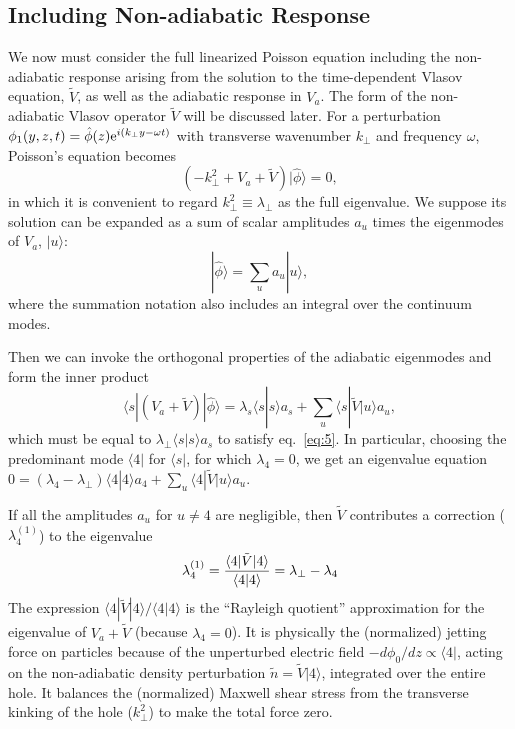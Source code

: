 \documentclass[12pt]{article}
\def\ket#1{|#1\rangle}
\def\bra#1{\langle#1}
\begin{document}
\subsection{Including Non-adiabatic Response}
We now must consider the full linearized Poisson equation including the
non-adiabatic response arising from the solution to the time-dependent
Vlasov equation, $\tilde{V}$, as well as the adiabatic response
in $V_a$. The form of the non-adiabatic Vlasov operator $\tilde{V}$ will
be discussed later. For a perturbation
$\phi_1(y,z,t)=\hat\phi(z){\rm e}^{i(k_\perp y-\omega t)}$ with
transverse wavenumber $k_\perp$ and frequency $\omega$, Poisson's
equation becomes
\begin{equation}
  \label{eq:5}
  (-k_\perp^2+V_a+\tilde{V})\ket{\hat\phi}=0,
\end{equation}
in which it is convenient to regard $k_\perp^2\equiv\lambda_\perp$ as the
full eigenvalue. 
We suppose its solution can be expanded as a sum of scalar
amplitudes $a_u$ times the eigenmodes of $V_a$, $\ket{u}$:
\begin{equation}
  \label{eq:6}
  \ket{\hat\phi}=\sum_u a_u \ket{u},
\end{equation}
where the summation notation also includes an integral over the
continuum modes.

Then we can invoke the orthogonal properties of the
adiabatic eigenmodes and form the inner product
\begin{equation}
  \label{eq:7}
  \bra{s}|(%
  V_a+\tilde{V})\ket{\hat\phi}
  = %
  \lambda_s\bra{s}\ket{s}a_s+\sum_u\bra{s}|\tilde{V}\ket{u}a_u,
\end{equation}
which must be equal to $\lambda_\perp\bra{s}\ket{s}a_s$ to satisfy eq.\ \ref{eq:5}.
In particular, choosing the predominant mode $\bra{4}|$ for
$\bra{s}|$, for which $\lambda_4=0$, we get an eigenvalue equation
$0=(\lambda_4-\lambda_\perp)\bra{4}\ket{4}a_4+\sum_u\bra{4}|\tilde{V}\ket{u}a_u$.

If all the amplitudes $a_u$ for $u\not=4$ are negligible, then
$\tilde{V}$ contributes a correction ($\lambda_{4}^{(1)}$) to the eigenvalue
\begin{equation}
  \label{eq:8}
  \lambda_{4}^{(1)}= {\bra{4}|\tilde{V}\ket{4}\over\bra{4}\ket{4}}=\lambda_\perp-\lambda_4
\end{equation}
The expression $\bra{4}|\tilde{V}\ket{4}/\bra{4}\ket{4}$ is the ``Rayleigh
quotient'' approximation for the eigenvalue of $V_a+\tilde{V}$
(because $\lambda_4=0$). It is
physically the (normalized) jetting force on particles because of the
unperturbed electric field $-d\phi_0/dz\propto\bra{4}|$, acting on the
non-adiabatic density perturbation $\tilde n = \tilde{V}\ket{4}$, integrated
over the entire hole. It balances the (normalized) Maxwell shear
stress from the transverse kinking of the hole ($k_\perp^2$) to
make the total force zero.
\end{document}
